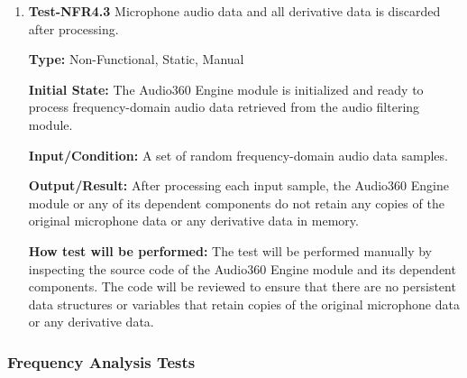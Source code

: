\documentclass[12pt, titlepage]{article}
\begin{document}
\begin{enumerate}
\item{\textbf{Test-NFR4.3} Microphone audio data and all derivative data is
 discarded after processing.\\}

\textbf{Type:} Non-Functional, Static, Manual

\textbf{Initial State:}
The Audio360 Engine module is initialized and ready to process frequency-domain
audio data retrieved from the audio filtering module.

\textbf{Input/Condition:}
A set of random frequency-domain audio data samples.

\textbf{Output/Result:}
After processing each input sample, the Audio360 Engine module or any of its
dependent components do not retain any copies of the original microphone data or
any derivative data in memory.

\textbf{How test will be performed:}
The test will be performed manually by inspecting the source code of the
Audio360 Engine module and its dependent components. The code will be reviewed
to ensure that there are no persistent data structures or variables that retain
copies of the original microphone data or any derivative data.

\end{enumerate}

\subsubsection{Frequency Analysis Tests}
\end{document}
